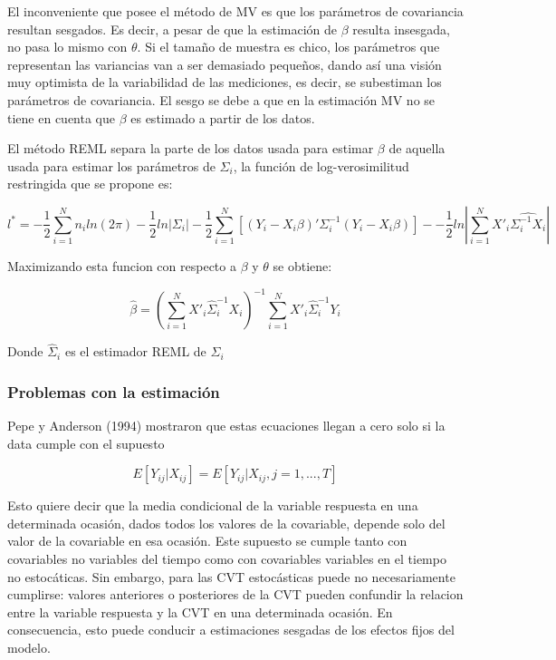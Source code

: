 \documentclass[spanish]{article}
\numberwithin{figure}{subsection}
\numberwithin{equation}{subsection}
\numberwithin{table}{subsection}
\begin{document}
El inconveniente que posee el método de MV es que los parámetros de covariancia
resultan sesgados. Es decir, a pesar de que la estimación de $\beta$ resulta
insesgada, no pasa lo mismo con $\theta$. Si el tamaño de muestra es chico, los
parámetros que representan las variancias van a ser demasiado pequeños, dando
así una visión muy optimista de la variabilidad de las mediciones, es decir, se
subestiman los parámetros de covariancia. El sesgo se debe a que en la
estimación MV no se tiene en cuenta que $\beta$ es estimado a partir de los
datos.

El método REML separa la parte de los datos usada para estimar $\beta$ de
aquella usada para estimar los parámetros de $\varSigma_i$, la función de
log-verosimilitud restringida que se propone es:

\begin{equation}
\label{REML}
	l^* = -\frac{1}{2} \sum_{i=1}^{N}n_i ln(2\pi) - \frac{1}{2}ln|\varSigma_i| -
	\frac{1}{2} \sum_{i=1}^{N} [(Y_i - X_i\beta)'
	\varSigma_i^{-1} (Y_i - X_i\beta)] -
	- \frac{1}{2} ln |\sum_{i=1}^{N} X'_i \hat{\varSigma_i^{-1} X_i}|
\end{equation}

Maximizando esta funcion con respecto a $\beta$ y $\theta$ se obtiene:

\[ \hat{\beta} = (\sum_{i=1}^{N} X'_i \hat{\varSigma}_i^{-1} X_i)^{-1}
\sum_{i=1}^{N} X'_i \hat{\varSigma}_i^{-1} Y_i\]

Donde $\hat{\varSigma}_i$ es el estimador REML de ${\varSigma_i}$

\subsubsection{Problemas con la estimación}

Pepe y Anderson (1994) mostraron que estas ecuaciones llegan a cero solo si la
data cumple con el supuesto

\begin{equation}
\label{estimation_issue}
	E[Y_{ij} | X_{ij}] = E[Y_{ij} | X_{ij}, j = 1, ..., T]
\end{equation}

Esto quiere decir que la media condicional de la variable respuesta en una
determinada ocasión, dados todos los valores de la covariable, depende solo del
valor de la covariable en esa ocasión. Este supuesto se cumple tanto con
covariables no variables del tiempo como con covariables variables en el tiempo
no estocáticas. Sin embargo, para las CVT estocásticas puede no necesariamente
cumplirse: valores anteriores o posteriores de la CVT pueden confundir la
relacion entre la variable respuesta y la CVT en una determinada ocasión. En
consecuencia, esto puede conducir a estimaciones sesgadas de los efectos fijos
del modelo.
\end{document}
